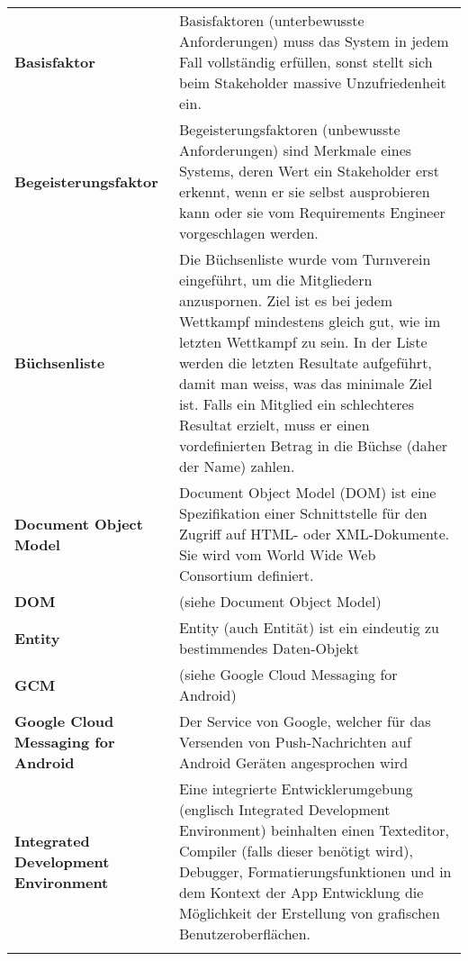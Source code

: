 \begin{longtable}{>{\raggedright}m{3cm}m{11cm}}
	\textbf{Basisfaktor}&
	Basisfaktoren (unterbewusste Anforderungen) muss das System in jedem Fall vollständig erfüllen, sonst stellt sich beim Stakeholder massive Unzufriedenheit ein. \cite{req_eng_book}\\ \addlinespace	

	\textbf{Begeisterungsfaktor}&
	Begeisterungsfaktoren (unbewusste Anforderungen) sind Merkmale eines Systems, deren Wert ein Stakeholder erst erkennt, wenn er sie selbst ausprobieren kann oder sie vom Requirements Engineer vorgeschlagen werden.\cite{req_eng_book}\\ \addlinespace	

	\textbf{Büchsenliste}&
	Die Büchsenliste wurde vom Turnverein eingeführt, um die Mitgliedern anzuspornen. Ziel ist es bei jedem Wettkampf mindestens gleich gut, wie im letzten Wettkampf zu sein. In der Liste werden die letzten Resultate aufgeführt, damit man weiss, was das minimale Ziel ist. Falls ein Mitglied ein schlechteres Resultat erzielt, muss er einen vordefinierten Betrag in die Büchse (daher der Name) zahlen.\\ \addlinespace	

	\textbf{Document Object Model}&
	 Document Object Model (DOM) ist eine Spezifikation einer Schnittstelle für den Zugriff auf HTML- oder XML-Dokumente. Sie wird vom World Wide Web Consortium definiert.\cite{wiki_dom}\\ \addlinespace	

	\textbf{DOM}&
	 (siehe Document Object Model)\\ \addlinespace	

	\textbf{Entity}&
	Entity (auch Entität) ist ein eindeutig zu bestimmendes Daten-Objekt \\ \addlinespace	

	\textbf{GCM}&
	(siehe Google Cloud Messaging for Android)\\ \addlinespace

	\textbf{Google Cloud Messaging for Android}&
	Der Service von Google, welcher für das Versenden von Push-Nachrichten auf Android Geräten angesprochen wird\\ \addlinespace	

	\textbf{Integrated Development Environment}&
	Eine integrierte Entwicklerumgebung (englisch Integrated Development Environment) beinhalten einen Texteditor, Compiler (falls dieser benötigt wird), Debugger, Formatierungsfunktionen und in dem Kontext der App Entwicklung die Möglichkeit der Erstellung von grafischen Benutzeroberflächen.\\ \addlinespace


\end{longtable}
